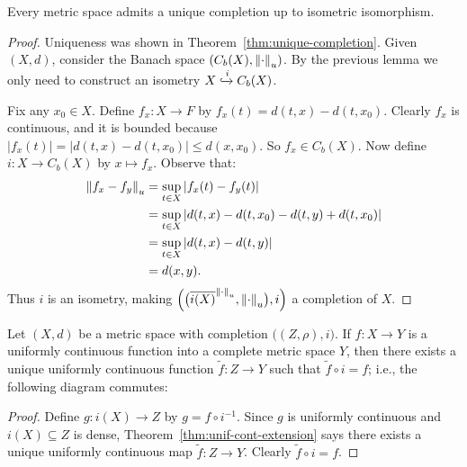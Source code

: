     \begin{theorem}
        Every metric space admits a unique completion up to isometric isomorphism.
    \end{theorem}
        \begin{proof}
            Uniqueness was shown in Theorem~\ref{thm:unique-completion}. Given $(X,d)$, consider the Banach space $(C_b(X),\left\lVert \cdot \right\rVert_u)$. By the previous lemma we only need to construct an isometry $X \xhookrightarrow{i} C_b(X)$.

            Fix any $x_0 \in X$. Define $f_x :X \rightarrow F$ by $f_x(t) = d(t,x) -d(t,x_0)$. Clearly $f_x$ is continuous, and it is bounded because $|f_x(t)| = |d(t,x) - d(t,x_0)| \leq d(x,x_0)$. So $f_x \in C_b(X)$. Now define $i:X \rightarrow C_b(X)$ by $x \mapsto f_x$. Observe that:
                \begin{equation*}
                \begin{split}
                    \left\lVert f_x - f_y \right\rVert_u
                    & = \sup_{t \in X}|f_x(t) - f_y(t)| \\
                    & = \sup_{t \in X}|d(t,x) - d(t,x_0) - d(t,y) + d(t,x_0)| \\
                    & = \sup_{t \in X} |d(t,x) - d(t,y)| \\
                    & = d(x,y).
                \end{split}
                \end{equation*}
            Thus $i$ is an isometry, making $\Bigl( \bigl(\overline{i(X)}^{\left\lVert \cdot \right\rVert_u} , \left\lVert \cdot \right\rVert_u\bigr), i\Bigr)$ a completion of $X$.
        \end{proof}

    \begin{theorem}
        Let $(X,d)$ be a metric space with completion $\bigl((Z,\rho), i\bigr)$. If $f:X \rightarrow Y$ is a uniformly continuous function into a complete metric space $Y$, then there exists a unique uniformly continuous function $\widetilde{f}:Z \rightarrow Y$ such that $\widetilde{f} \circ i = f$; i.e., the following diagram commutes:
            \begin{center}
            \end{center}
    \end{theorem}
        \begin{proof}
            Define $g:i(X) \rightarrow Z$ by $g = f \circ i^{-1}$. Since $g$ is uniformly continuous and $i(X) \subseteq Z$ is dense, Theorem~\ref{thm:unif-cont-extension} says there exists a unique uniformly continuous map $\widetilde{f}:Z \rightarrow Y$. Clearly $\widetilde{f} \circ i = f$.
        \end{proof}

